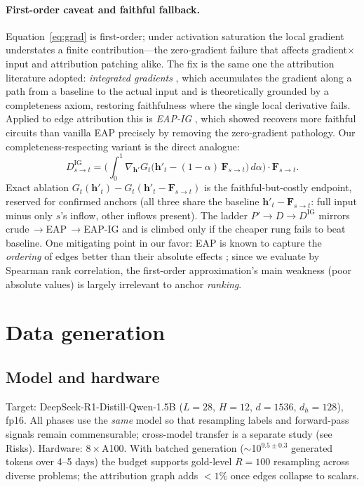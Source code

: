 \documentclass[11pt]{article}
\newcommand{\F}{\mathbf{F}}
\newcommand{\hh}{\mathbf{h}}
\begin{document}
\paragraph{First-order caveat and faithful fallback.}
Equation~\eqref{eq:grad} is first-order; under activation saturation the local gradient understates a
finite contribution---the zero-gradient failure that affects gradient$\times$input and attribution
patching alike. The fix is the same one the attribution literature adopted: \emph{integrated
gradients} \cite{sundararajan2017axiomatic}, which accumulates the gradient along a path from a
baseline to the actual input and is theoretically grounded by a completeness axiom, restoring
faithfulness where the single local derivative fails. Applied to edge attribution this is
\emph{EAP-IG} \cite{hanna2024faith}, which \cite{hanna2024faith} showed recovers more faithful circuits
than vanilla EAP precisely by removing the zero-gradient pathology. Our completeness-respecting variant
is the direct analogue:
\begin{equation}
D^{\mathrm{IG}}_{s\to t}=\Big(\textstyle\int_0^1 \nabla_{\hh'}G_t\big(\hh'_t-(1-\alpha)\,\F_{s\to t}\big)\,d\alpha\Big)\cdot\F_{s\to t}.
\label{eq:ig}
\end{equation}
Exact ablation $G_t(\hh'_t)-G_t(\hh'_t-\F_{s\to t})$ is the faithful-but-costly endpoint, reserved for
confirmed anchors (all three share the baseline $\hh'_t-\F_{s\to t}$: full input minus only $s$'s inflow,
other inflows present). The ladder $P'\!\to D\!\to D^{\mathrm{IG}}$ mirrors crude$\,\to$EAP$\,\to$EAP-IG and
is climbed only if the cheaper rung fails to beat baseline. One mitigating point in our favor: EAP is
known to capture the \emph{ordering} of edges better than their absolute effects \cite{hanna2024faith};
since we evaluate by Spearman rank correlation, the first-order approximation's main weakness (poor
absolute values) is largely irrelevant to anchor \emph{ranking}.

\section{Data generation}
\label{sec:data}

\subsection{Model and hardware}
Target: DeepSeek-R1-Distill-Qwen-1.5B ($L{=}28$, $H{=}12$, $d{=}1536$, $d_h{=}128$), fp16. All phases
use the \emph{same} model so that resampling labels and forward-pass signals remain commensurable;
cross-model transfer is a separate study (see Risks). Hardware: $8\times$A100. With batched generation
($\sim$10$^{9.5\pm0.3}$ generated tokens over 4--5 days) the budget supports gold-level $R{=}100$
resampling across diverse problems; the attribution graph adds $<1\%$ once edges collapse to scalars.
\end{document}
